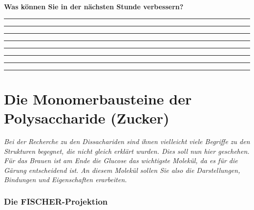 \documentclass{scrartcl}  %
\begin{document}
\begin{center}
\begin{tcolorbox}
\begin{center}
\begin{tikzpicture}[scale=1]
							\end{tikzpicture}
						\end{center}
						\textbf{{\Large Was können Sie in der nächsten Stunde verbessern?}}
						\begin{center}
							\noindent\rule{12cm}{0.2pt}
							\vspace{1.1cm}
							\noindent\rule{12cm}{0.1pt}
							\vspace{1.1cm}
							\noindent\rule{12cm}{0.1pt}
							\vspace{1.1cm}
							\noindent\rule{12cm}{0.1pt}
							\vspace{1.1cm}
							\noindent\rule{12cm}{0.1pt}
							\vspace{1.1cm}
							\noindent\rule{12cm}{0.1pt}
							\vspace{1.1cm}
							\noindent\rule{12cm}{0.1pt}
							\vspace{1.1cm}
							\noindent\rule{12cm}{0.1pt}
						\end{center}
					\end{tcolorbox}
				\end{center}
								

\newpage	
	\part{Die Monomerbausteine der Polysaccharide (Zucker)}
	
		\textit{Bei der Recherche zu den Dissachariden sind ihnen vielleicht viele Begriffe zu den Strukturen begegnet, die nicht gleich erklärt wurden. Dies soll nun hier geschehen. Für das Brauen ist am Ende die Glucose das wichtigste Molekül, da es für die Gärung entscheidend ist. An diesem Molekül sollen Sie also die Darstellungen, Bindungen und Eigenschaften erarbeiten.} \newline

	\section{Die FISCHER-Projektion}
\end{document}
